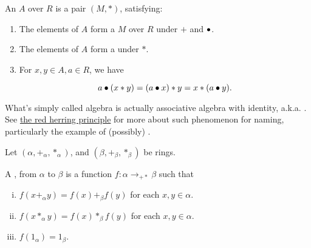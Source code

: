 \begin{definition}[Algebra]
    \label{Algebra}
    \leanok

    An  $A$ over $R$ is a pair $(M, *)$, satisfying:

    \begin{enumerate}
    \item The elements of $A$ form a  $M$ over $R$ under $+$ and $\bullet$.

    \item The elements of $A$ form a  under $*$.

    \item For $x, y \in A, a \in R$, we have
    
    $$
    a \bullet (x * y) = (a \bullet x) * y = x * (a \bullet y).
    $$

    \end{enumerate}

\end{definition}

\begin{remark}
    \label{mk:Algebra}

    What's simply called algebra is actually associative algebra with identity, a.k.a. . See
    \href{https://ncatlab.org/nlab/show/red%20herring%20principle}{the red herring principle}
    for more about such phenomenon for naming, particularly the example of (possibly) .
    
\end{remark}

\begin{definition}
    \label{RingHom}

    Let $(\alpha, +_\alpha, *_\alpha)$, and $(\beta, +_\beta, *_\beta)$ be rings.
    
    A , from $\alpha$ to $\beta$ is a function $f : \alpha \to_{+*} \beta$ such that

	\begin{enumerate}[(i)]
		\item $f(x +_{\alpha} y) = f(x) +_{\beta} f(y)$ for each $x,y \in \alpha$.
		\item $f(x *_{\alpha} y) = f(x) *_{\beta} f(y)$ for each $x,y \in \alpha$.
		\item $f(1_{\alpha}) = 1_{\beta}$.
	\end{enumerate}

\end{definition}

